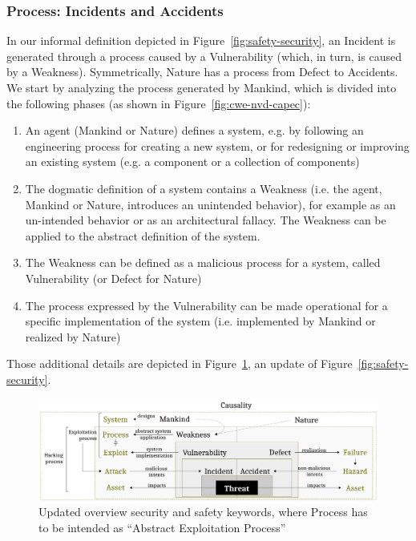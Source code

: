 \documentclass{article}
\theoremstyle{definition}
\theoremstyle{corollary}
\theoremstyle{lemma}
\theoremstyle{theorem}
\theoremstyle{theorem}
\begin{document}
\subsubsection{Process: Incidents and Accidents}\label{sec:incidentaccident}
In our informal definition depicted in Figure~\ref{fig:safety-security}, an
Incident is generated through a process caused by a Vulnerability (which,
in turn, is caused by a Weakness). Symmetrically, Nature has a process from Defect
to Accidents. We start by analyzing the process generated by Mankind, which is
divided into the following phases (as shown in Figure~\ref{fig:cwe-nvd-capec}):
\begin{enumerate}
	\item An agent (Mankind or Nature) defines a system, e.g. by following an engineering process for creating a new system, or for redesigning or improving an existing system (e.g. a component or a collection of components) 
	\item The dogmatic definition of a system contains a Weakness (i.e. the agent, Mankind or Nature, introduces an unintended behavior), for example as an un-intended behavior or as an architectural fallacy. The Weakness can be applied to the abstract definition of the system.
	\item The Weakness can be defined as a malicious process for a system, called Vulnerability (or Defect for Nature)
	\item The process expressed by the Vulnerability can be made operational for a specific implementation of the system (i.e. implemented by Mankind or realized by Nature) 
\end{enumerate}
Those additional details are depicted in Figure~\ref{fig:safety-security_2}, an update
of Figure~\ref{fig:safety-security}.

\begin{figure}[t]
	\centering
	\includegraphics[width=\textwidth]{safety-security_2.pdf}
	\caption{Updated overview security and safety keywords, where Process
	has to be intended as ``Abstract Exploitation Process''}
	\label{fig:safety-security_2}
\end{figure}
\end{document}
